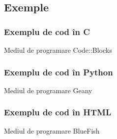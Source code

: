 \documentclass[compress]{beamer}
\begin{document}
\subsection{Exemple}

\begin{frame}
\frametitle{Exemplu de cod \^{i}n C}

\begin{alertblock}{Mediul de programare Code::Blocks}

\end{alertblock}

\end{frame}


\begin{frame}
\frametitle{Exemplu de cod \^{i}n Python}

\begin{alertblock}{Mediul de programare Geany}

\end{alertblock}

\end{frame} 


\begin{frame}
\frametitle{Exemplu de cod \^{i}n HTML}

\begin{alertblock}{Mediul de programare BlueFish}

\end{alertblock}

\end{frame} 
\end{document}
